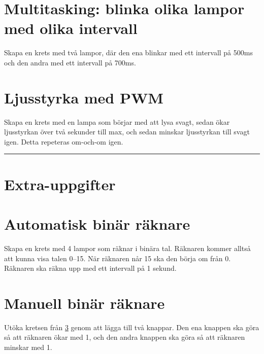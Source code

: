 \documentclass[11pt]{article}
\begin{document}
\section{Multitasking: blinka olika lampor med olika intervall}

Skapa en krets med två lampor, där den ena blinkar med ett intervall på 500ms
och den andra med ett intervall på 700ms.

\section{Ljusstyrka med PWM}\label{sec:pwm}

Skapa en krets med en lampa som börjar med att lysa svagt, sedan ökar ljusstyrkan
över två sekunder till max, och sedan minskar ljusstyrkan till svagt igen. Detta repeteras om-och-om igen.

\vspace{2em}
\hrule
\section*{Extra-uppgifter}

\section{Automatisk binär räknare}\label{sec:binar-raknare}
Skapa en krets med 4 lampor som räknar i binära tal. Räknaren kommer alltså att
kunna visa talen 0--15. När räknaren når 15 ska den börja om från 0. Räknaren
ska räkna upp med ett intervall på 1 sekund.

\section{Manuell binär räknare}\label{sec:manuell-binar-raknare}
Utöka kretsen från \ref{sec:binar-raknare} genom att lägga till två knappar.
Den ena knappen ska göra så att räknaren ökar med 1, och den andra knappen ska
göra så att räknaren minskar med 1.
\end{document}
